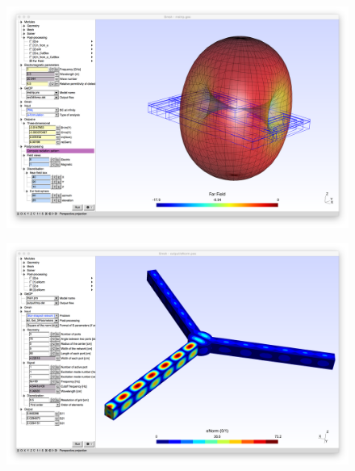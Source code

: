\documentclass[12pt]{beamer}
\begin{document}
\begin{frame}{}
	\begin{figure}
		\centering
		\hspace*{-2.5em}\href{https://gitlab.onelab.info/doc/models/wikis/Antennas}{\includegraphics[width=1.2\linewidth]{Antennas_screenshot2}}
	\end{figure}
\end{frame}

\begin{frame}{}
	\begin{figure}
		\centering
		\hspace*{-2.5em}\href{https://gitlab.onelab.info/doc/models/wikis/Waveguides}{\includegraphics[width=1.2\linewidth]{Waveguides_screenshot2}}
	\end{figure}
\end{frame}
\end{document}
